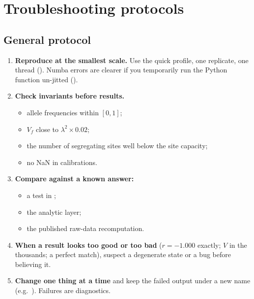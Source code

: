 \chapter{Troubleshooting protocols}\label{ch:trouble}

\section{General protocol}
\begin{enumerate}
\item \textbf{Reproduce at the smallest scale.} Use the quick profile, one replicate, one thread (). Numba errors are clearer if you temporarily run the Python function un-jitted ().
\item \textbf{Check invariants before results.}
  \begin{itemize}
  \item allele frequencies within $[0,1]$;
  \item $V_f$ close to $\lambda^2\times0.02$;
  \item the number of segregating sites well below the site capacity;
  \item no NaN in calibrations.
  \end{itemize}
\item \textbf{Compare against a known answer:}
  \begin{itemize}
  \item a test in ;
  \item the analytic layer;
  \item the published raw-data recomputation.
  \end{itemize}
\item \textbf{When a result looks too good or too bad} ($r=-1.000$ exactly; $V$ in the thousands; a perfect match), suspect a degenerate state or a bug before believing it.
\item \textbf{Change one thing at a time} and keep the failed output under a new name (e.g.\ ). Failures are diagnostics.
\end{enumerate}

